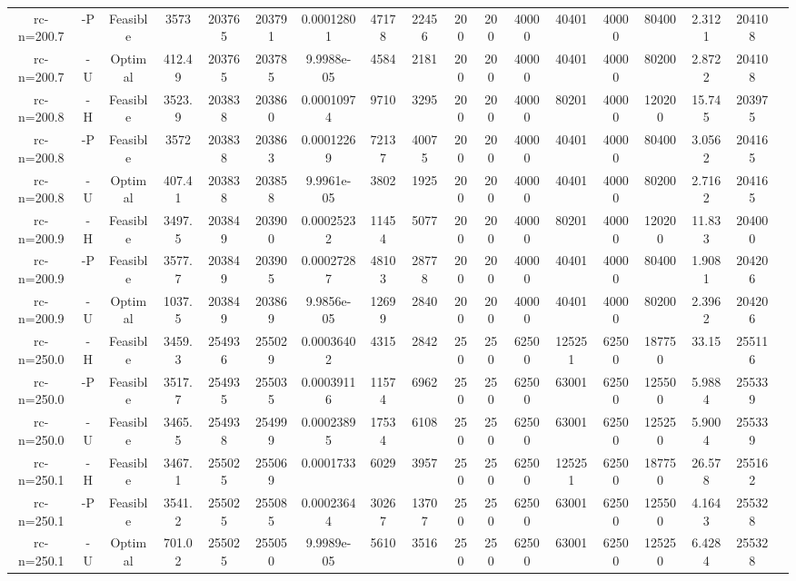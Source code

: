 \documentclass[landscape, a4paper]{article}
\begin{document}
\begin{center}
\begin{tabular}{@{}cccccccccccccccccc@{}}
rc-n=200.7 & -P & Feasible & 3573 & 203765 & 203791 & 0.00012801 & 47178 & 22456 & 200 & 200 & 40000 & 40401 & 40000 & 80400 & 2.3121 & 204108 & \\
rc-n=200.7 & -U & Optimal & 412.49 & 203765 & 203785 & 9.9988e-05 & 4584 & 2181 & 200 & 200 & 40000 & 40401 & 40000 & 80200 & 2.8722 & 204108 & \\
rc-n=200.8 & -H & Feasible & 3523.9 & 203838 & 203860 & 0.00010974 & 9710 & 3295 & 200 & 200 & 40000 & 80201 & 40000 & 120200 & 15.745 & 203975 & \\
rc-n=200.8 & -P & Feasible & 3572 & 203838 & 203863 & 0.00012269 & 72137 & 40075 & 200 & 200 & 40000 & 40401 & 40000 & 80400 & 3.0562 & 204165 & \\
rc-n=200.8 & -U & Optimal & 407.41 & 203838 & 203858 & 9.9961e-05 & 3802 & 1925 & 200 & 200 & 40000 & 40401 & 40000 & 80200 & 2.7162 & 204165 & \\
rc-n=200.9 & -H & Feasible & 3497.5 & 203849 & 203900 & 0.00025232 & 11454 & 5077 & 200 & 200 & 40000 & 80201 & 40000 & 120200 & 11.833 & 204000 & \\
rc-n=200.9 & -P & Feasible & 3577.7 & 203849 & 203905 & 0.00027287 & 48103 & 28778 & 200 & 200 & 40000 & 40401 & 40000 & 80400 & 1.9081 & 204206 & \\
rc-n=200.9 & -U & Optimal & 1037.5 & 203849 & 203869 & 9.9856e-05 & 12699 & 2840 & 200 & 200 & 40000 & 40401 & 40000 & 80200 & 2.3962 & 204206 & \\
rc-n=250.0 & -H & Feasible & 3459.3 & 254936 & 255029 & 0.00036402 & 4315 & 2842 & 250 & 250 & 62500 & 125251 & 62500 & 187750 & 33.15 & 255116 & \\
rc-n=250.0 & -P & Feasible & 3517.7 & 254935 & 255035 & 0.00039116 & 11574 & 6962 & 250 & 250 & 62500 & 63001 & 62500 & 125500 & 5.9884 & 255339 & \\
rc-n=250.0 & -U & Feasible & 3465.5 & 254938 & 254999 & 0.00023895 & 17534 & 6108 & 250 & 250 & 62500 & 63001 & 62500 & 125250 & 5.9004 & 255339 & \\
rc-n=250.1 & -H & Feasible & 3467.1 & 255025 & 255069 & 0.0001733 & 6029 & 3957 & 250 & 250 & 62500 & 125251 & 62500 & 187750 & 26.578 & 255162 & \\
rc-n=250.1 & -P & Feasible & 3541.2 & 255025 & 255085 & 0.00023644 & 30267 & 13707 & 250 & 250 & 62500 & 63001 & 62500 & 125500 & 4.1643 & 255328 & \\
rc-n=250.1 & -U & Optimal & 701.02 & 255025 & 255050 & 9.9989e-05 & 5610 & 3516 & 250 & 250 & 62500 & 63001 & 62500 & 125250 & 6.4284 & 255328 & \\

\end{tabular}
\end{center}
\end{document}
